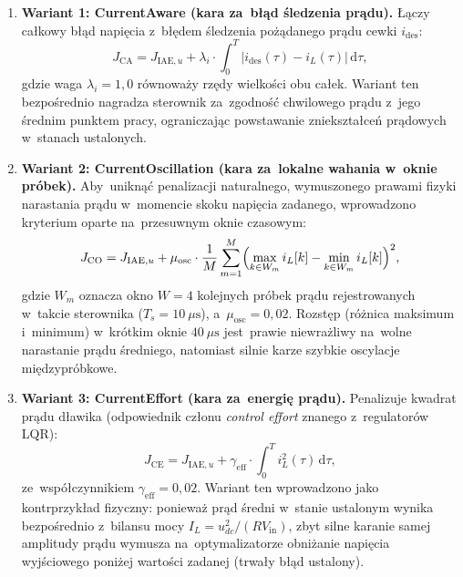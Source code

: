 \begin{enumerate}
    \item \textbf{Wariant 1: CurrentAware (kara za~błąd śledzenia prądu).} Łączy całkowy błąd napięcia z~błędem śledzenia pożądanego prądu cewki $i_{\mathrm{des}}$:
    \begin{equation}
        J_{\mathrm{CA}} = J_{\mathrm{IAE},u} + \lambda_i \cdot \int_0^T \lvert i_{\mathrm{des}}(\tau) - i_L(\tau) \rvert\,\mathrm{d}\tau,
        \label{eq:cost-currentaware}
    \end{equation}
    gdzie waga $\lambda_i = 1{,}0$ równoważy rzędy wielkości obu całek. Wariant ten bezpośrednio nagradza sterownik za~zgodność chwilowego prądu z~jego średnim punktem pracy, ograniczając powstawanie zniekształceń prądowych w~stanach ustalonych.
    
    \item \textbf{Wariant 2: CurrentOscillation (kara za~lokalne wahania w~oknie próbek).} Aby~uniknąć penalizacji naturalnego, wymuszonego prawami fizyki narastania prądu w~momencie skoku napięcia zadanego, wprowadzono kryterium oparte na~przesuwnym oknie czasowym:
    \begin{equation}
        J_{\mathrm{CO}} = J_{\mathrm{IAE},u} + \mu_{\mathrm{osc}} \cdot \frac{1}{M}\sum_{m=1}^M \Bigl(\max_{k\in W_m} i_L[k] - \min_{k\in W_m} i_L[k]\Bigr)^2,
        \label{eq:cost-currentoscillation}
    \end{equation}
    gdzie $W_m$ oznacza okno $W = 4$ kolejnych próbek prądu rejestrowanych w~takcie sterownika ($T_s = 10~\mu\mathrm{s}$), a~$\mu_{\mathrm{osc}} = 0{,}02$. Rozstęp (różnica maksimum i~minimum) w~krótkim oknie $40~\mu\mathrm{s}$ jest~prawie niewrażliwy na~wolne narastanie prądu średniego, natomiast silnie karze szybkie oscylacje międzypróbkowe.
    
    \item \textbf{Wariant 3: CurrentEffort (kara za~energię prądu).} Penalizuje kwadrat prądu dławika (odpowiednik członu \emph{control effort} znanego z~regulatorów LQR):
    \begin{equation}
        J_{\mathrm{CE}} = J_{\mathrm{IAE},u} + \gamma_{\mathrm{eff}} \cdot \int_0^T i_L^2(\tau)\,\mathrm{d}\tau,
        \label{eq:cost-currenteffort}
    \end{equation}
    ze~współczynnikiem $\gamma_{\mathrm{eff}} = 0{,}02$. Wariant ten wprowadzono jako kontrprzykład fizyczny: ponieważ prąd średni w~stanie ustalonym wynika bezpośrednio z~bilansu mocy $I_L = u_{dc}^2 / (R V_{\mathrm{in}})$, zbyt silne karanie samej amplitudy prądu wymusza na~optymalizatorze obniżanie napięcia wyjściowego poniżej wartości zadanej (trwały błąd ustalony).
\end{enumerate}

